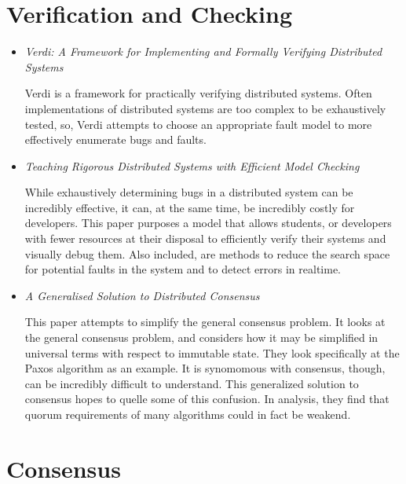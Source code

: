 \documentclass{article}
\begin{document}
\tableofcontents{}

\section{Verification and Checking}

\begin{itemize}
	\item
	\textit{Verdi: A Framework for Implementing and Formally Verifying Distributed Systems} \cite{Verdi}

	Verdi is a framework for practically verifying distributed systems. Often implementations of distributed systems are
	too complex to be exhaustively tested, so, Verdi attempts to choose an appropriate fault model to more effectively enumerate bugs and faults.

	\item
	\textit{Teaching Rigorous Distributed Systems with Efficient Model Checking} \cite{MichaelWAET2019}

	While exhaustively determining bugs in a distributed system can be incredibly effective, it can, at the same time, be incredibly costly for developers.
	This paper purposes a model that allows students, or developers with fewer resources at their disposal to efficiently verify their systems and visually debug them.
	Also included, are methods to reduce the search space for potential faults in the system and to detect errors in realtime.

	\item
	\textit{A Generalised Solution to Distributed Consensus} \cite{HowardGeneralized}

	This paper attempts to simplify the general consensus problem. It looks at the general consensus problem, and considers how it may be simplified in universal terms with respect to immutable state. They look specifically at the Paxos algorithm as an example. 
	It is synomomous with consensus, though, can be incredibly difficult to understand. This generalized solution to consensus hopes to quelle some of this confusion.
	In analysis, they find that quorum requirements of many algorithms could in fact be weakend.

\end{itemize}

\section{Consensus}
\end{document}
